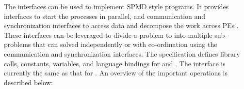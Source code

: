 
The \openshmem{} interfaces can be used to implement \ac{SPMD} style programs. It provides interfaces 
to start the \openshmem{} processes in parallel, and communication and synchronization interfaces to access data and decompose the work across \ac{PE}s . These interfaces can be leveraged to divide a problem to into multiple sub-problems that can solved independently or with co-ordination using the communication and synchronization interfaces.
The \openshmem specification defines library calls, constants, variables, and language bindings for \Clang{} and \Fortran{}.
The \Cpp{} interface is currently the same as that for \Clang. An overview of the important \openshmem operations is described below:

